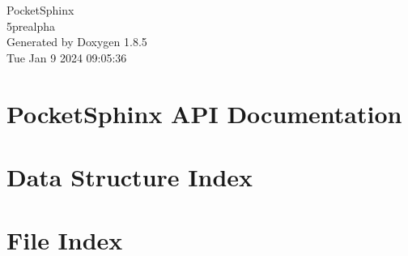 \documentclass[twoside]{book}
\newcommand{\clearemptydoublepage}{%
  \newpage{\pagestyle{empty}\cleardoublepage}%
}
\begin{document}
\begin{titlepage}
\vspace*{7cm}
\begin{center}%
{\Large Pocket\-Sphinx \\[1ex]\large 5prealpha }\\
\vspace*{1cm}
{\large Generated by Doxygen 1.8.5}\\
\vspace*{0.5cm}
{\small Tue Jan 9 2024 09:05:36}\\
\end{center}
\end{titlepage}
\clearemptydoublepage
\tableofcontents
\clearemptydoublepage
{}

\chapter{Pocket\-Sphinx A\-P\-I Documentation}
\label{index}
\chapter{Data Structure Index}

\chapter{File Index}

\end{document}
